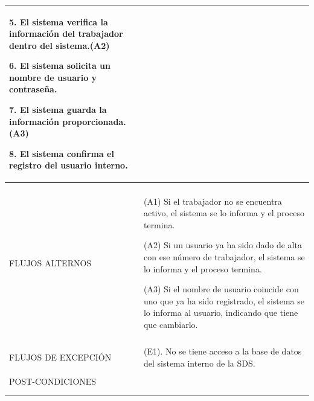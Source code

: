 \begin{longtable}{@{\extracolsep{8pt}}l p{8.5cm}}
 5. El sistema verifica la información del trabajador dentro del sistema.(A2) \par\vspace{.1cm}

 6. El sistema solicita un nombre de usuario y contraseña. \par\vspace{.1cm}

 7. El sistema guarda la información proporcionada.(A3) \par\vspace{.1cm}

 8. El sistema confirma el registro del usuario interno. \par\vspace{.1cm}

   \par\vspace{.1cm}

\\
\hline \\[-1ex]

FLUJOS ALTERNOS & 
\par\vspace{.1cm} (A1) Si el trabajador no se encuentra activo, el sistema se lo informa y el proceso termina.

\par\vspace{.1cm} (A2) Si un usuario ya ha sido dado de alta con ese número de trabajador, el sistema se lo informa y el proceso termina.

\par\vspace{.1cm} (A3) Si el nombre de usuario coincide con uno que ya ha sido registrado, el sistema se lo informa al usuario, indicando que tiene que cambiarlo. 



\\
\hline \\[-1ex]

FLUJOS DE EXCEPCIÓN & 
\par\vspace{.1cm} (E1). No se tiene acceso a la base de datos del sistema interno de la SDS.


\\%

\hline \\[-1ex]
POST-CONDICIONES & 
\\
\hline 
\hline \\[-1.8ex]
 \\
\end{longtable}


